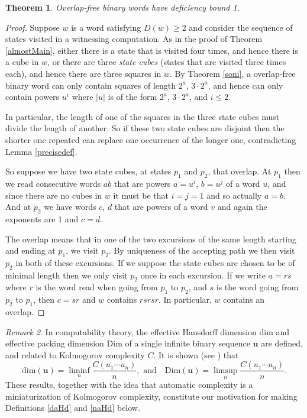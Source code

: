\documentclass[12pt]{article}
\newcommand{\abs}[1]{\lvert#1\rvert}
\theoremstyle{plain}
\newtheorem{thm}{Theorem}
\theoremstyle{definition}
\theoremstyle{remark}
\newtheorem{rem}[thm]{Remark}
\begin{document}
			\begin{thm}\label{main}
				Overlap-free binary words have deficiency bound 1.
			\end{thm}
			\begin{proof}
				Suppose $w$ is a word satisfying $D(w)\ge 2$ and consider the sequence of states visited in a witnessing computation.
				As in the proof of Theorem \ref{almostMain}, either there is a state that is visited four times, and hence there is a cube in $w$,
				or there are three \emph{state cubes} (states that are visited three times each), and hence there are three squares in $w$.
				By Theorem \ref{soni}, a overlap-free binary word can only contain squares of length $2^a$, $3\cdot 2^a$,
				and hence can only contain powers $u^i$ where $\abs{u}$ is of the form $2^a$, $3\cdot 2^a$, and $i\le 2$.

				In particular, the length of one of the squares in the three state cubes must divide the length of another.
				So if these two state cubes are disjoint then the shorter one repeated
				can replace one occurrence of the longer one, contradicting Lemma \ref{precisedef}.

				So suppose we have two state cubes, at states $p_1$ and $p_2$, that overlap.
				At $p_1$ then we read consecutive words $ab$ that are powers $a=u^i$, $b=u^j$ of a word $u$, and since
				there are no cubes in $w$ it must be that $i=j=1$ and so actually $a=b$.
				And at $p_2$ we have words $c$, $d$ that are powers of a word $v$ and again the exponents are 1 and $c=d$.

				The overlap means that in one of the two excursions of the same length starting and ending at $p_1$,
				we visit $p_2$. By uniqueness of the accepting path
				we then visit $p_2$ in both of these excursions.
				If we suppose the state cubes are chosen to be of minimal length then we only visit $p_2$ once in each excursion.
				If we write $a=rs$ where $r$ is the word read when going from $p_1$ to $p_2$, and $s$ is the word going from $p_2$ to $p_1$, then
				$c=sr$ and $w$ contains $rsrsr$. In particular, $w$ contains an overlap.
			\end{proof}
			\begin{rem}
				In computability theory, the effective Hausdorff dimension $\mathrm{dim}$ and effective packing dimension $\mathrm{Dim}$ of
				a single infinite binary sequence $\mathbf u$ are defined, and related to Kolmogorov complexity $C$.
				It is shown (see \cite[Theorem 13.3.4 and Corollary 13.11.12]{DH}) that
				\[
					\mathrm{dim}(\mathbf u) = \liminf_n\frac{C(u_1 \cdots u_n)}{n},\text{ and}
					\quad \mathrm{Dim}(\mathbf u) = \limsup_n\frac{C(u_1 \cdots u_n)}{n}.
				\]
				These results, together with the idea that automatic complexity is a miniaturization of Kolmogorov complexity,
				constitute our motivation for making Definitions \ref{daHd} and \ref{naHd} below.
			\end{rem}
\end{document}
